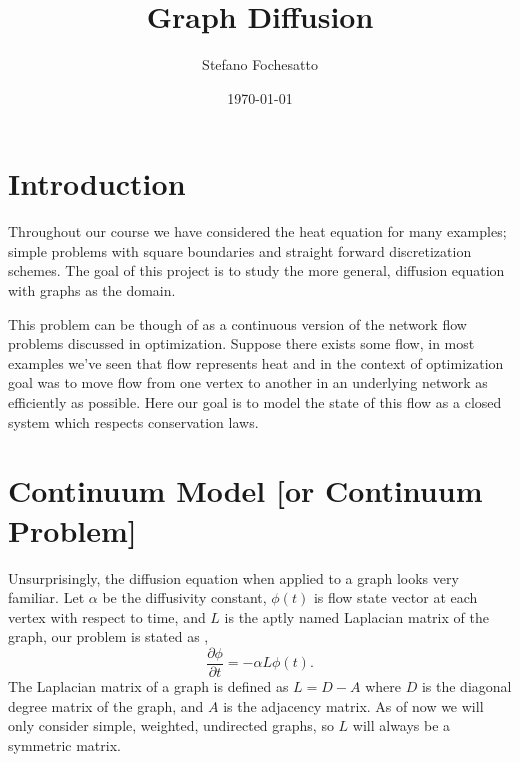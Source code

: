 \documentclass[11pt]{article}
\begin{document}
\title{Graph Diffusion}

\author{Stefano Fochesatto}

\date{\today}

\maketitle

\section{Introduction}  
Throughout our course we have considered the heat equation for many examples; simple 
problems with square boundaries and straight forward discretization schemes. The goal of this project
is to study the more general, diffusion equation with graphs as the domain. 

This problem can be though of as a continuous version of the network flow problems discussed in optimization. 
Suppose there exists some flow, in most examples we've seen that flow represents heat and in the context of optimization
goal was to move flow from one vertex to another in an underlying network as efficiently as possible. Here 
our goal is to model the state of this flow as a closed system which respects conservation laws. 















\section{Continuum Model [or Continuum Problem]}  Unsurprisingly, the diffusion equation 
when applied to a graph looks very familiar. Let $\alpha$ be the diffusivity constant, $\phi(t)$ 
is flow state vector at each vertex with respect to time, and $L$ is the aptly named Laplacian matrix of 
the graph, our problem is stated as \cite{Simon},
\begin{equation*}
    \dfrac{\partial \phi}{\partial t} = -\alpha L \phi(t).
\end{equation*}
The Laplacian matrix of a graph is defined as $L = D - A$ where $D$ is the diagonal degree matrix of the graph, 
and $A$ is the adjacency matrix\cite{spielman}. As of now we will only consider simple, weighted, undirected graphs, so $L$ will 
always be a symmetric matrix. 
\end{document}
